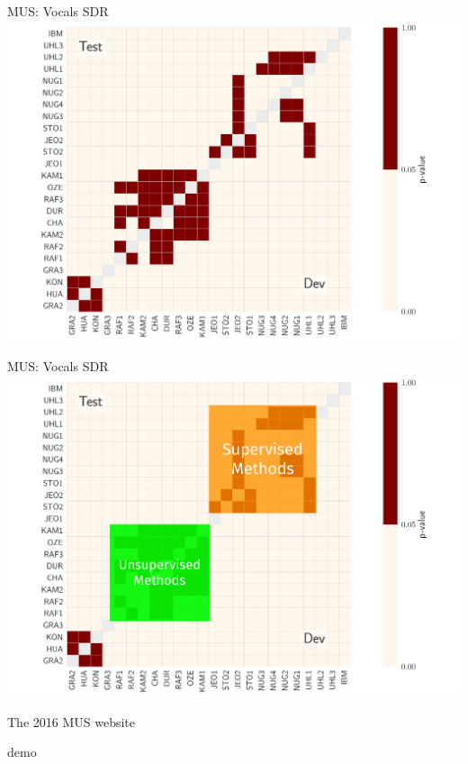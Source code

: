 \documentclass{beamer}
\begin{document}
\begin{frame}{MUS: Vocals SDR}
\includegraphics[width=\textwidth]{fig/wilcox_voc_sdr_slide.pdf}
\end{frame}

\begin{frame}{MUS: Vocals SDR}
\includegraphics[width=\textwidth]{fig/wilcox_voc_sdr_slide_marked.pdf}
\end{frame}

\begin{frame}{The 2016 MUS website}
\begin{center}
demo
\end{center}
\end{frame}
\end{document}
